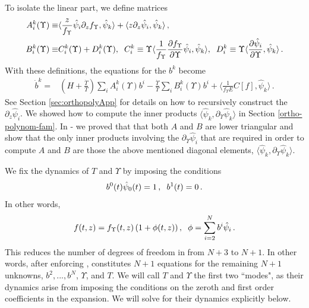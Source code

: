 To isolate the linear part, we define matrices
\begin{align}\label{ABmatrices}
A^k_i(\Upsilon)\equiv&\langle\frac{z}{f_\Upsilon }\hat\psi_i\partial_zf_\Upsilon ,\hat\psi_k\rangle+\langle z\partial_z \hat\psi_i,\hat\psi_k\rangle\,,\\
B^k_i(\Upsilon)\equiv& C_i^k(\Upsilon)+D_i^k(\Upsilon),\hspace{2mm} C_i^k\equiv\Upsilon\langle\frac{1}{f_\Upsilon }\frac{\partial f_\Upsilon }{\partial\Upsilon}\hat\psi_i,\hat\psi_k\rangle,\hspace{2mm} D_i^k\equiv\Upsilon\langle\frac{\partial\hat{\psi}_i}{\partial \Upsilon},\hat\psi_k\rangle\,. \notag
\end{align}
 With these definitions, the equations for the $b^k$ become
\begin{align}\label{bEq}
\dot b^k=& \left(H+\frac{\dot{T}}{T}\right)\sum_i A_i^k(\Upsilon)b^i-\frac{\dot{\Upsilon}}{\Upsilon}\sum_i B_i^k(\Upsilon)b^i+\langle\frac{1}{f_\Upsilon E}C[f],\hat\psi_k\rangle\,.
\end{align}
 See Section \ref{sec:orthopolyApp} for details on how to recursively construct the $\partial_z\hat\psi_i$. We showed how to compute the inner products $\langle\hat\psi_k,\partial_{\Upsilon}\hat\psi_k\rangle$ in  Section \ref{ortho-polynom-fam}. In  - we proved that that both $A$ and $B$ are lower triangular and show that the only inner products involving the $\partial_\Upsilon\hat{\psi}_i$ that are required in order to compute $A$ and $B$ are those the above mentioned diagonal elements, $\langle\hat\psi_k,\partial_{\Upsilon}\hat\psi_k\rangle$.


We fix the dynamics of $T$ and $\Upsilon$ by imposing the conditions
\begin{equation}\label{bIcs}
b^0(t)\hat\psi_0(t)=1\,,\hspace{2mm}b^1(t)=0\,.
\end{equation}
In other words,
\begin{equation}
f(t,z)=f_\Upsilon (t,z)\left(1+\phi(t,z)\right),\hspace{2mm} \phi=\sum_{i=2}^N b^i\hat\psi_i\,.
\end{equation}
This reduces the number of degrees of freedom in  from $N+3$ to $N+1$.  In other words, after enforcing ,  constitutes $N+1$ equations for the remaining $N+1$ unknowns, $b^2,...,b^N$, $\Upsilon$, and $T$.  We will call $T$ and $\Upsilon$ the first two ``modes", as their dynamics arise from imposing the conditions  on the zeroth and first order coefficients in the expansion. We will solve for their dynamics explicitly below.

